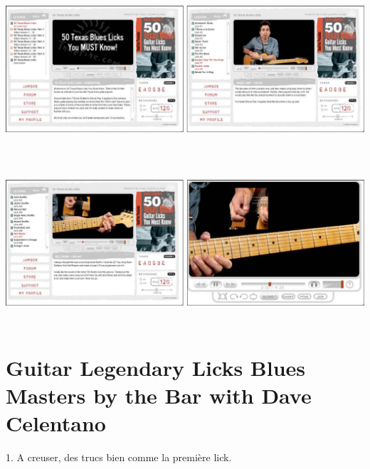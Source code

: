 \documentclass[a4paper]{book}
\begin{document}
\begin{center}
\includegraphics[width=17cm,height=5.976cm]{lebluessupportsmethodes-img95.jpg}
\end{center}


\begin{center}
\includegraphics[width=17cm,height=5.976cm]{lebluessupportsmethodes-img96.jpg}
\end{center}
\clearpage


\section[Guitar Legendary Licks Blues Masters by the Bar with Dave
Celentano]{Guitar Legendary Licks Blues Masters by the Bar with Dave
Celentano}
\hypertarget{RefHeadingToc154973218262}{}1. A creuser, des trucs bien
comme la premi\`ere lick.
\end{document}
